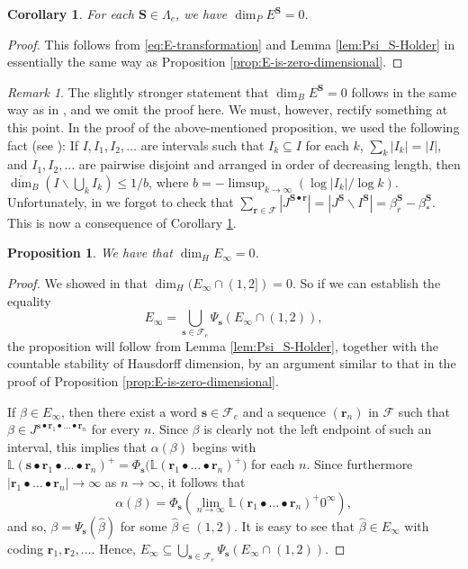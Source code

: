 \documentclass[12pt]{amsart}
\newtheorem{proposition}[theorem]{Proposition}
\newtheorem{corollary}[theorem]{Corollary}
\theoremstyle{definition}
\theoremstyle{remark}
\newtheorem{remark}[theorem]{Remark}
\numberwithin{equation}{section}
\renewcommand{\L}{\ensuremath{\mathbb{L}}}
\newcommand{\cF}{\mathcal{F}}
\newcommand{\s}{ {\mathbf{s}}}
\newcommand{\cs}{ {\mathbf{S}}}
\renewcommand{\r}{ {\mathbf{r}}}
\newcommand{\f}{\infty}
\newcommand{\al}{\alpha}
\newcommand{\La}{\Lambda}
\begin{document}
{\begin{corollary} \label{cor:packing-dimension-of-E-S}
For each $\cs\in\La_e$, we have $\dim_P E^\cs=0$.
\end{corollary}

\begin{proof}
This follows from \eqref{eq:E-transformation} and Lemma \ref{lem:Psi_S-Holder} in essentially the same way as Proposition \ref{prop:E-is-zero-dimensional}.
\end{proof}

\begin{remark} \label{rem:box-dimension}
The slightly stronger statement that $\dim_B E^\cs=0$ follows in the same way as in \cite[Proposition 5.6 (ii)]{Allaart-Kong-2021}, and we omit the proof here. We must, however, rectify something at this point. In the proof of the above-mentioned proposition, we used the following fact (see \cite[Proposition 3.6]{Falconer_1997}): If $I,I_1,I_2,\dots$ are intervals such that $I_k\subseteq I$ for each $k$, $\sum_k|I_k|=|I|$, and $I_1,I_2,\dots$ are pairwise disjoint and arranged in order of decreasing length, then $\overline{\dim}_B (I\backslash \bigcup_k I_k)\leq 1/b$, where $b=-\limsup_{k\to\f}(\log|I_k|/\log k)$. Unfortunately, in \cite{Allaart-Kong-2021} we forgot to check that $\sum_{\r\in\cF}|J^{\cs\bullet\r}|=|J^\cs\backslash I^\cs|=\beta_r^\cs-\beta_*^\cs$. This is now a consequence of Corollary \ref{cor:packing-dimension-of-E-S}.
\end{remark}

\begin{proposition} \label{prop:E-infinity-small}
We have that $\dim_H E_\f=0$.
\end{proposition}

\begin{proof}
We showed in \cite[Proposition 5.8]{Allaart-Kong-2021} that $\dim_H(E_\f\cap(1,2])=0$. So if we can establish the equality
\begin{equation} \label{eq:E-infinity-self-similar}
E_\f=\bigcup_{\s\in\cF_e} \Psi_\s(E_\f\cap(1,2)),
\end{equation}
the proposition will follow from Lemma \ref{lem:Psi_S-Holder}, together with the countable stability of Hausdorff dimension, by an argument similar to that in the proof of Proposition \ref{prop:E-is-zero-dimensional}.

If $\beta\in E_\f$, then there exist a word $\s\in\cF_e$ and a sequence $(\r_n)$ in $\cF$ such that $\beta\in J^{\s\bullet\r_1\bullet\dots\bullet\r_n}$ for every $n$. Since $\beta$ is clearly not the left endpoint of such an interval, this implies that $\al(\beta)$ begins with $\L(\s\bullet\r_1\bullet\dots\bullet\r_n)^+=\Phi_\s\big(\L(\r_1\bullet\dots\bullet\r_n)^+\big)$ for each $n$. Since furthermore $|\r_1\bullet\dots\bullet\r_n|\to\f$ as $n\to\f$, it follows that
\[
\al(\beta)=\Phi_\s\left(\lim_{n\to\f}\L(\r_1\bullet\dots\bullet\r_n)^+0^\f\right),
\]
and so, $\beta=\Psi_\s(\hat{\beta})$ for some $\hat{\beta}\in(1,2)$. It is easy to see that $\hat{\beta}\in E_\f$ with coding $\r_1,\r_2,\dots$. Hence, $E_\f\subseteq \bigcup_{\s\in\cF_e} \Psi_\s(E_\f\cap(1,2))$.


\end{proof}}
\end{document}
